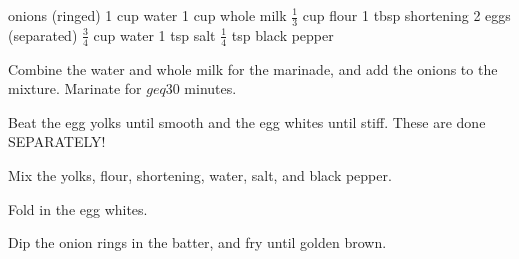 \dishtype{\vegetarian}
\begin{ingreds}
     onions (ringed)
        1 cup water
        1 cup whole milk
    \columnbreak{}
    $\frac{1}{3}$ cup flour
        1 tbsp shortening
        2 eggs (separated)
        $\frac{3}{4}$ cup water
        1 tsp salt
        $\frac{1}{4}$ tsp black pepper
\end{ingreds}
\begin{method}
    Combine the water and whole milk for the marinade, and add the onions to the mixture. Marinate for $geq$30 minutes.\par
    Beat the egg yolks until smooth and the egg whites until stiff. These are done SEPARATELY!\@\par
    Mix the yolks, flour, shortening, water, salt, and black pepper.\par
    Fold in the egg whites.\par
    Dip the onion rings in the batter, and fry until golden brown.
\end{method}
